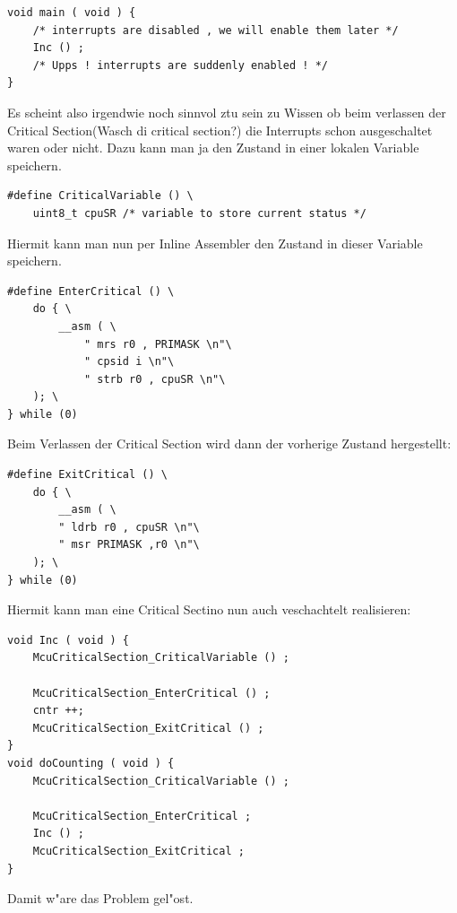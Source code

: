 \documentclass[a4paper, 8pt]{extarticle}
\begin{document}
\begin{multicols*}{3}
\begin{description}
\begin{lstlisting}
void main ( void ) {
	/* interrupts are disabled , we will enable them later */
	Inc () ;
	/* Upps ! interrupts are suddenly enabled ! */
}
								\end{lstlisting}
								Es scheint also irgendwie noch sinnvol ztu sein zu Wissen ob beim verlassen der Critical Section(Wasch di critical section?)
								die Interrupts schon ausgeschaltet waren oder nicht. Dazu kann man ja den Zustand in einer lokalen Variable speichern.
								\begin{lstlisting}
#define CriticalVariable () \
	uint8_t cpuSR /* variable to store current status */
								\end{lstlisting}
								Hiermit kann man nun per Inline Assembler den Zustand in dieser Variable speichern.
								\begin{lstlisting}
#define EnterCritical () \
	do { \
		__asm ( \
			" mrs r0 , PRIMASK \n"\
			" cpsid i \n"\
			" strb r0 , cpuSR \n"\
	); \
} while (0)
								\end{lstlisting}
								Beim Verlassen der Critical Section wird dann der vorherige Zustand hergestellt:
								\begin{lstlisting}
#define ExitCritical () \
	do { \
		__asm ( \
		" ldrb r0 , cpuSR \n"\
		" msr PRIMASK ,r0 \n"\
	); \
} while (0)
								\end{lstlisting}
								Hiermit kann man eine Critical Sectino nun auch veschachtelt realisieren:
								\begin{lstlisting}
void Inc ( void ) {
	McuCriticalSection_CriticalVariable () ;

	McuCriticalSection_EnterCritical () ;
	cntr ++;
	McuCriticalSection_ExitCritical () ;
}
void doCounting ( void ) {
	McuCriticalSection_CriticalVariable () ;
	
	McuCriticalSection_EnterCritical ;
	Inc () ;
	McuCriticalSection_ExitCritical ;
}
								\end{lstlisting}
								Damit w"are das Problem gel"ost.
					\end{description}

\end{multicols*}
\end{document}
